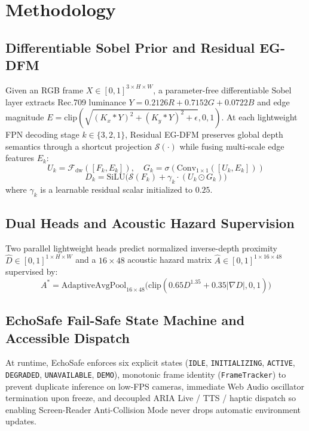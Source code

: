 \documentclass[conference]{IEEEtran}
\begin{document}
\section{Methodology}

\subsection{Differentiable Sobel Prior and Residual EG-DFM}
Given an RGB frame $X \in [0,1]^{3 \times H \times W}$, a parameter-free differentiable Sobel layer extracts Rec.709 luminance $Y = 0.2126R + 0.7152G + 0.0722B$ and edge magnitude $E = \mathrm{clip}(\sqrt{(K_x * Y)^2 + (K_y * Y)^2 + \epsilon}, 0, 1)$. At each lightweight FPN decoding stage $k \in \{3, 2, 1\}$, Residual EG-DFM preserves global depth semantics through a shortcut projection $\mathcal{S}(\cdot)$ while fusing multi-scale edge features $E_k$:
\begin{equation}
  U_k = \mathcal{F}_{\text{dw}}([F_k, E_k]), \quad G_k = \sigma(\mathrm{Conv}_{1\times 1}([U_k, E_k]))
\end{equation}
\begin{equation}
  D_k = \mathrm{SiLU}\big(\mathcal{S}(F_k) + \gamma_k \cdot (U_k \odot G_k)\big)
\end{equation}
where $\gamma_k$ is a learnable residual scalar initialized to $0.25$.

\subsection{Dual Heads and Acoustic Hazard Supervision}
Two parallel lightweight heads predict normalized inverse-depth proximity $\hat{D} \in [0,1]^{1 \times H \times W}$ and a $16\times 48$ acoustic hazard matrix $\hat{A} \in [0,1]^{1 \times 16 \times 48}$ supervised by:
\begin{equation}
  A^* = \mathrm{AdaptiveAvgPool}_{16\times 48}\big(\mathrm{clip}(0.65 D^{1.35} + 0.35 |\nabla D|, 0, 1)\big)
\end{equation}

\subsection{EchoSafe Fail-Safe State Machine and Accessible Dispatch}
At runtime, EchoSafe enforces six explicit states (\texttt{IDLE}, \texttt{INITIALIZING}, \texttt{ACTIVE}, \texttt{DEGRADED}, \texttt{UNAVAILABLE}, \texttt{DEMO}), monotonic frame identity (\texttt{FrameTracker}) to prevent duplicate inference on low-FPS cameras, immediate Web Audio oscillator termination upon freeze, and decoupled ARIA Live / TTS / haptic dispatch so enabling Screen-Reader Anti-Collision Mode never drops automatic environment updates.
\end{document}
